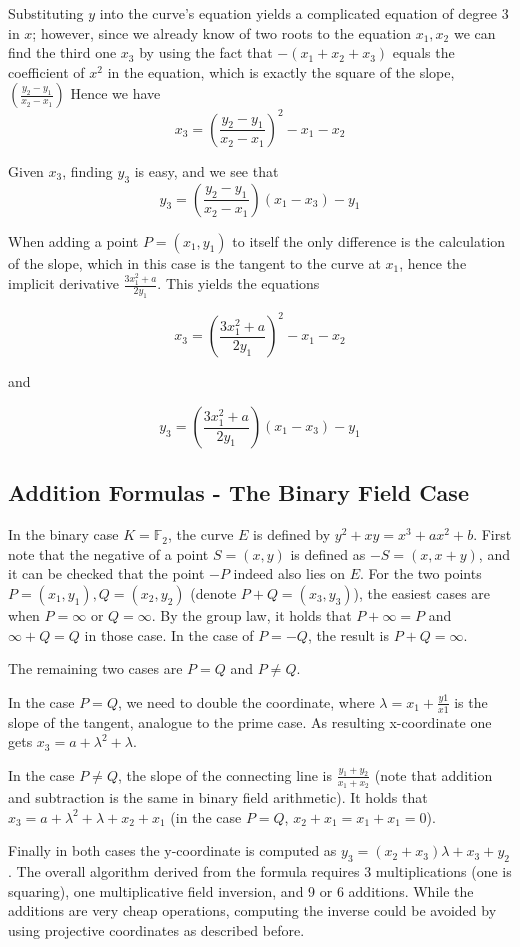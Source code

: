 \documentclass[11pt,english]{article}
\begin{document}
Substituting $y$ into the curve's equation yields a complicated equation of degree 3 in $x$; however, since we already know of two roots to the equation $x_1,x_2$
we can find the third one $x_3$ by using the fact that $-(x_1+x_2+x_3)$ equals the coefficient of $x^2$ in the equation, which is exactly the square of the slope, $\left(\frac{y_2-y_1}{x_2-x_1}\right)$ 
Hence we have $$x_3=\left(\frac{y_2-y_1}{x_2-x_1}\right)^2-x_1-x_2$$

Given $x_3$, finding $y_3$ is easy, and we see that $$y_3=\left(\frac{y_2-y_1}{x_2-x_1}\right)(x_1-x_3)-y_1$$

When adding a point $P=(x_1,y_1)$ to itself the only difference is the calculation of the slope, which in this case is the tangent to the curve at $x_1$, hence
the implicit derivative $\frac{3x_1^2+a}{2y_1}$. This yields the equations 

$$x_3=\left(\frac{3x_1^2+a}{2y_1}\right)^2-x_1-x_2$$

and

$$y_3=\left(\frac{3x_1^2+a}{2y_1}\right)(x_1-x_3)-y_1$$

\subsection{Addition Formulas - The Binary Field Case}
In the binary case $K=\mathbb{F}_2$, the curve $E$ is defined by $y^2+xy=x^3+ax^2+b$. First note that the negative of a point $S=(x,y)$ is defined as $-S=(x,x+y)$, and it can be checked that the point $-P$ indeed also lies on $E$.
For the two points $P=(x_1,y_1),Q=(x_2,y_2)$ (denote $P+Q=(x_3,y_3)$), the easiest cases are when $P=\infty$ or $Q=\infty$. By the group law, it holds that $P+\infty=P$ and $\infty+Q=Q$ in those case. In the case of $P=-Q$, the result is $P+Q=\infty$.

The remaining two cases are $P=Q$ and $P\ne Q$.

In the case $P=Q$, we need to double the coordinate, where $\lambda=x_1+\frac{y1}{x1}$ is the slope of the tangent, analogue to the prime case. As resulting x-coordinate one gets $x_3=a+\lambda^2+\lambda$.

In the case $P\ne Q$, the slope of the connecting line is $\frac{y_1+y_2}{x_1+x_2}$ (note that addition and subtraction is the same in binary field arithmetic). It holds that $x_3=a+\lambda^2+\lambda+x_2+x_1$ (in the case $P=Q$, $x_2+x_1=x_1+x_1=0$).

Finally in both cases the y-coordinate is computed as $y_3=(x_2+x_3)\lambda+x_3+y_2$. The overall algorithm derived from the formula requires 3 multiplications (one is squaring), one multiplicative field inversion, and 9 or 6 additions. While the additions are very cheap operations, computing the inverse could be avoided by using projective coordinates as described before.
\end{document}
